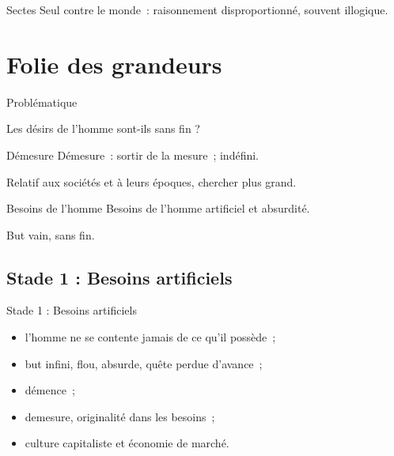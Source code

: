 \documentclass{beamer}
\begin{document}
\begin{frame}{Sectes}
  Seul contre le monde~: raisonnement disproportionné, souvent illogique.
\end{frame}

\section{Folie des grandeurs}

\begin{frame}{Problématique}
  \begin{center}
    Les désirs de l'homme sont-ils sans fin ?
  \end{center}
\end{frame}

\begin{frame}{Démesure}
  Démesure~: sortir de la mesure~; indéfini.

  Relatif aux sociétés et à leurs époques, chercher plus grand.
\end{frame}

\begin{frame}{Besoins de l'homme}
  Besoins de l'homme artificiel et absurdité.

  But vain, sans fin.
\end{frame}

\subsection{Stade 1 : Besoins artificiels}
\begin{frame}{Stade 1 : Besoins artificiels}
  \begin{itemize}
    \item l'homme ne se contente jamais de ce qu'il possède~;
    \item but infini, flou, absurde, quête perdue d'avance~;
    \item démence~;
    \item demesure, originalité dans les besoins~;
    \item culture capitaliste et économie de marché.
  \end{itemize}
\end{frame}
\end{document}
